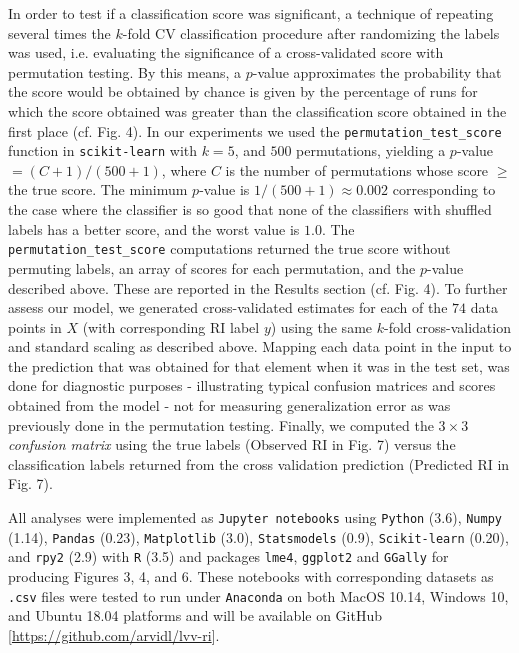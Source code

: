 \documentclass[10pt,letterpaper]{article}
\begin{document}
In order to test if a classification score was significant, a technique of repeating several times the 
$k$-fold CV classification procedure after randomizing the labels was used, 
i.e. evaluating the significance of a cross-validated score with permutation testing.
By this means, a $p$-value approximates the probability that the score would be obtained by chance is given by the percentage of runs for which the score obtained was greater than the classification score obtained in the first place (cf. Fig. 4). In our experiments we used the 
{\tt permutation\_test\_score} function in {\tt scikit-learn} with $k=5$, and $500$ permutations, yielding a  $p$-value $= (C + 1) / (500 + 1)$, where $C$ is the number of permutations whose score $\geq$ the true score.
The minimum $p$-value is $1/(500+1) \approx 0.002$ corresponding to the case where the classifier is so good that none of the classifiers with shuffled labels has a better score, and the worst value is $1.0$.
The {\tt permutation\_test\_score} computations returned the true score without permuting labels, an array of scores for each permutation, and 
the $p$-value described above. These are reported in the Results section (cf. Fig. 4).
To further assess our model, we generated cross-validated estimates for each of the $74$ data points in $X$ (with corresponding RI label $y$) using the same $k$-fold cross-validation and standard scaling as described above. Mapping each data point in the input to the
prediction that was obtained for that element when it was in the test set, was done for diagnostic purposes - illustrating typical confusion matrices and scores obtained from the model - not for measuring generalization error as was previously done in the permutation testing. Finally, we computed the $3 \times 3$ {\it confusion matrix} using the true labels (Observed RI in Fig. 7) versus the classification labels returned from the cross validation prediction (Predicted RI in Fig. 7).

\vspace{3mm}
 
\noindent All analyses were implemented as {\tt Jupyter notebooks} 
using {\tt Python} (3.6), {\tt Numpy} (1.14), {\tt Pandas} (0.23), {\tt Matplotlib} (3.0), 
{\tt Statsmodels} (0.9), {\tt Scikit-learn} (0.20), and {\tt rpy2} (2.9) with {\tt R} (3.5) and packages {\tt lme4}, {\tt ggplot2} and {\tt GGally} for producing Figures 3, 4, and 6. These notebooks with corresponding datasets as {\tt .csv} files were tested to run under {\tt Anaconda} on both MacOS 10.14, Windows 10, and Ubuntu 18.04 platforms and will be available on GitHub [{\small \url{https://github.com/arvidl/lvv-ri}}].
\end{document}
